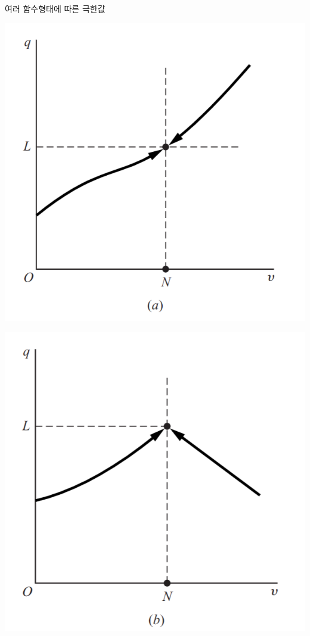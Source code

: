 \documentclass[aspectratio=169]{beamer}
\begin{document}
\begin{frame}{여러 함수형태에 따른 극한값}
  \begin{minipage}[t]{0.48\textwidth}
    \centering
    \includegraphics[width=\linewidth,height=0.48\textheight,keepaspectratio]{fig/limits_illustration_a.png}
  \end{minipage}
  \hfill
  \begin{minipage}[t]{0.48\textwidth}
    \centering
    \includegraphics[width=\linewidth,height=0.48\textheight,keepaspectratio]{fig/limits_illustration_b.png}
  \end{minipage}


\end{frame}
\end{document}
